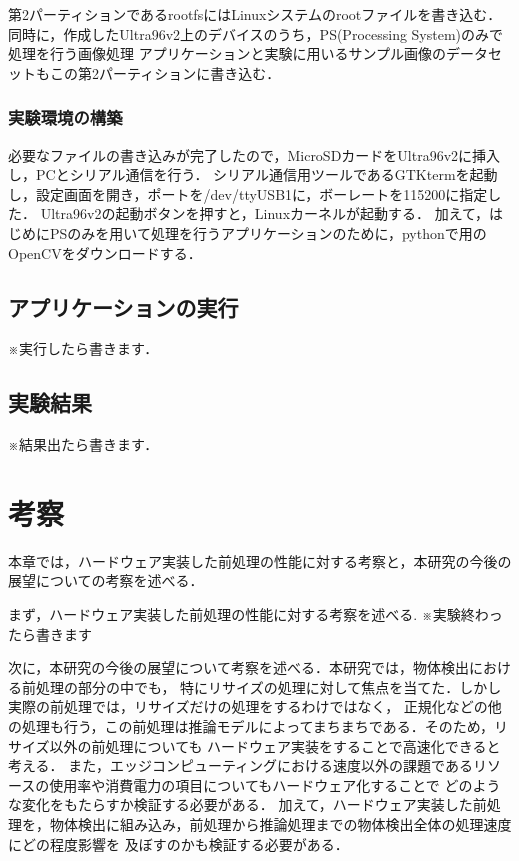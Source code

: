 \documentclass[11pt,a4j]{jreport}
\begin{document}
第2パーティションであるrootfsにはLinuxシステムのrootファイルを書き込む．
同時に，作成したUltra96v2上のデバイスのうち，PS(Processing System)のみで処理を行う画像処理
アプリケーションと実験に用いるサンプル画像のデータセットもこの第2パーティションに書き込む．

\subsection{実験環境の構築}
必要なファイルの書き込みが完了したので，MicroSDカードをUltra96v2に挿入し，PCとシリアル通信を行う．
シリアル通信用ツールであるGTKtermを起動し，設定画面を開き，ポートを/dev/ttyUSB1に，ボーレートを115200に指定した．
Ultra96v2の起動ボタンを押すと，Linuxカーネルが起動する．
加えて，はじめにPSのみを用いて処理を行うアプリケーションのために，pythonで用のOpenCVをダウンロードする．
\section{アプリケーションの実行}
※実行したら書きます．
\section{実験結果}
※結果出たら書きます．
%
\chapter{考察}
本章では，ハードウェア実装した前処理の性能に対する考察と，本研究の今後の展望についての考察を述べる．

まず，ハードウェア実装した前処理の性能に対する考察を述べる.
※実験終わったら書きます

次に，本研究の今後の展望について考察を述べる．本研究では，物体検出における前処理の部分の中でも，
特にリサイズの処理に対して焦点を当てた．しかし実際の前処理では，リサイズだけの処理をするわけではなく，
正規化などの他の処理も行う，この前処理は推論モデルによってまちまちである．そのため，リサイズ以外の前処理についても
ハードウェア実装をすることで高速化できると考える．
また，エッジコンピューティングにおける速度以外の課題であるリソースの使用率や消費電力の項目についてもハードウェア化することで
どのような変化をもたらすか検証する必要がある．
加えて，ハードウェア実装した前処理を，物体検出に組み込み，前処理から推論処理までの物体検出全体の処理速度にどの程度影響を
及ぼすのかも検証する必要がある．
\end{document}
